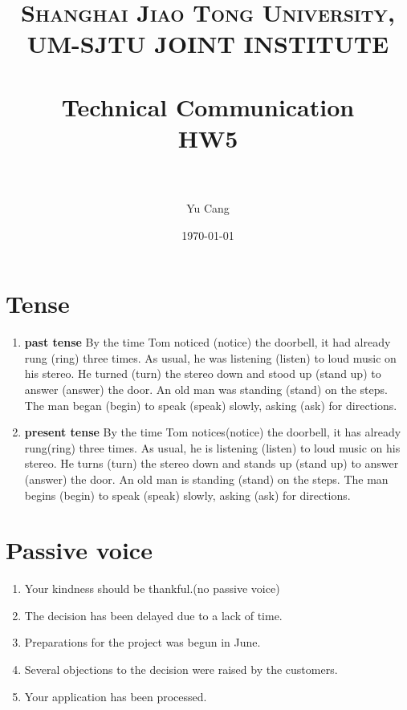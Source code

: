 \documentclass[paper=a4, fontsize=11pt]{scrartcl} %
\title{	
\normalfont \normalsize 
\textsc{Shanghai Jiao Tong University, UM-SJTU JOINT INSTITUTE} \\ [25pt] %
\horrule{0.5pt} \\[0.4cm] %
\huge Technical Communication\\ HW5 \\ %
\horrule{2pt} \\[0.5cm] %
}
\author{Yu Cang \quad 018370210001} %
\date{\normalsize \today} %
\numberwithin{equation}{section} %
\numberwithin{figure}{section} %
\numberwithin{table}{section} %
\begin{document}
\maketitle %

\section{Tense}
	\begin{enumerate}
		\item \textbf{past tense}\newline
			By the time Tom noticed (notice) the doorbell, it had already rung (ring) three times. As usual, he was listening (listen) to loud music on his stereo. He turned (turn) the stereo down and stood up (stand up) to answer (answer) the door. An old man was standing (stand) on the steps. The man began (begin) to speak (speak) slowly, asking (ask) for directions.
		
		\item \textbf{present tense}\newline
			By the time Tom notices(notice) the doorbell, it has already rung(ring) three times. As usual, he is listening (listen) to loud music on his stereo. He turns (turn) the stereo down and stands up (stand up) to answer (answer) the door. An old man is standing (stand) on the steps. The man begins (begin) to speak (speak) slowly, asking (ask) for directions.
	\end{enumerate}

\section{Passive voice}
	\begin{enumerate}
		\item 
			Your kindness should be thankful.(no passive voice)
		\item 
			The decision has been delayed due to a lack of time.
		\item 
			Preparations for the project was begun in June.
		\item 
			Several objections to the decision were raised by the customers.
		\item 
			Your application has been processed.
	\end{enumerate}
\end{document}
